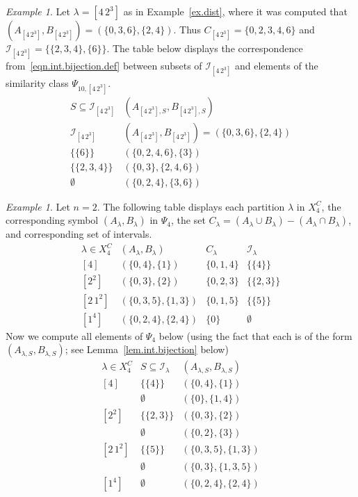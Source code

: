 \documentclass[reqno,11pt]{amsart}
\theoremstyle{remark}
\theoremstyle{remark}
\newtheorem{example}[Thm]{Example}
\theoremstyle{definition}
\theoremstyle{definition}
\theoremstyle{definition}
\numberwithin{equation}{section}
\newcommand{\gl}{\lambda}
\begin{document}
\begin{example}\label{ex.4222} Let $\lambda=[4\,2^3]$ as in Example~\ref{ex.dist}, where it was computed that $(A_{[4\,2^3]}, B_{[4\,2^3]}) = (\{0,3,6\},\{2,4\})$. Thus $C_{[4\,2^3]} = \{0,2,3,4,6\}$ and $\mathcal I_{[4\,2^3]} = \{ \{2,3,4\},\{6\} \}$. The table below displays the correspondence from~\eqref{eqn.int.bijection.def} between subsets of $\mathcal I_{[4\, 2^3]}$ and elements of the similarity class $\Psi_{10, [4\,2^3]}$.
\[
\begin{array}{c|c}
S\subseteq \mathcal I_{[4\, 2^3]} & (A_{[4\,2^3], S}, B_{[4\,2^3], S})\\ \hline
 \mathcal I_{[4\, 2^3]} &  (A_{[4\,2^3]}, B_{[4\,2^3]}) = (\{0,3,6\},\{2,4\}) \\
 \{\{6\} \} & (\{0,2,4,6\},\{3\}) \\
 \{\{2,3,4\}\} &  (\{0,3\},\{2,4,6\}) \\ 
 \emptyset & (\{0,2,4\},\{3,6\})
\end{array}
\]
\end{example}


\begin{example}\label{ex.C2} Let $n=2$. The following table displays each partition $\lambda$ in $X_4^C$, the corresponding symbol $(A_\lambda, B_\lambda)$ in $\Psi_4$, the set $C_\lambda = (A_\gl \cup B_\gl) - (A_\gl\cap B_\gl)$, and corresponding set of intervals.
\[
\begin{array}{c|c|c|c}
\lambda\in X_4^C & (A_\lambda, B_\lambda) & C_\lambda & \mathcal I_\lambda\\ \hline
[4] & (\{0,4\}, \{1\}) & \{0,1,4\} & \{\{4\}\} \\ \hline
[2^2] & (\{0,3\}, \{2\}) & \{0,2,3\} & \{\{2,3\}\} \\ \hline
[2\,1^2] & (\{0,3,5\},\{1,3\}) & \{0,1, 5\} & \{\{5\}\} \\ \hline
[1^4] &  (\{0,2,4\},\{2,4\}) & \{0\} & \emptyset
\end{array}
\]
Now we compute all elements of $\Psi_4$ below (using the fact that each is of the form $(A_{\lambda, S}, B_{\lambda, S})$; see Lemma~\ref{lem.int.bijection} below)
\[
\begin{array}{c|c|c}
\lambda\in X_4^C & S\subseteq \mathcal I_\lambda & (A_{\lambda, S}, B_{\lambda, S}) \\ \hline
[4] &  \{\{4\}\} & (\{0,4\}, \{1\}) \\  
 & \emptyset & (\{0\}, \{1,4\}) \\ \hline
[2^2] &  \{\{2,3\}\} &  (\{0,3\}, \{2\}) \\
 & \emptyset & (\{0,2\}, \{3\}) \\ \hline
 [2\,1^2] &  \{\{5\}\} & (\{0,3,5\},\{1,3\}) \\
 & \emptyset & (\{0,3\},\{1,3,5\}) \\ \hline
[1^4] & \emptyset  &  (\{0,2,4\},\{2,4\})
\end{array}
\]
\end{example}
\end{document}
